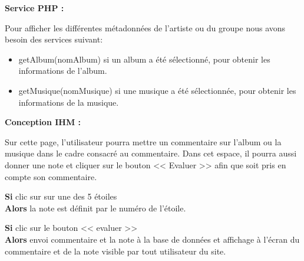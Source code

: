            \begin{paragraphe}
                \textbf{Service PHP :}
            \end{paragraphe}

            \begin{paragraphe}
                Pour afficher les différentes métadonnées de l'artiste ou du groupe nous avons besoin des services suivant:
                \begin{itemize}
                        \item getAlbum(nomAlbum) si un album a été sélectionné, pour obtenir les informations de l'album.
                        \item getMusique(nomMusique) si une musique a été sélectionnée, pour obtenir les informations de la musique.
                \end{itemize}
            \end{paragraphe}

            \begin{paragraphe}
                \textbf{Conception IHM :}
            \end{paragraphe}

			\begin{paragraphe}
				Sur cette page, l'utilisateur pourra mettre un commentaire sur l'album ou la musique dans le cadre consacré au commentaire.
				Dans cet espace, il pourra aussi donner une note et cliquer sur le bouton << Evaluer >> afin que soit pris en compte son commentaire.
			\end{paragraphe}

			\begin{paragraphe}
				\textbf{Si} clic sur sur une des 5 étoiles \\
				\textbf{Alors} la note est définit par le numéro de l'étoile.
			\end{paragraphe}

			\begin{paragraphe}
				\textbf{Si} clic sur le bouton << evaluer >> \\
				\textbf{Alors} envoi commentaire et la note à la base de données et affichage à l'écran du commentaire et de la note visible par tout utilisateur du site.
			\end{paragraphe}


        \clearpage


